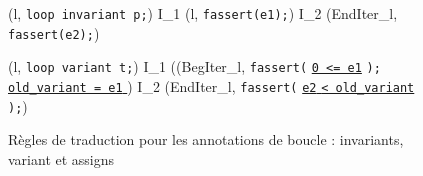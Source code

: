 \begin{figure*}[bt]
  \scriptsize{
    {
      {
      }
    }

    {
      {
        (l, \mbox{\lstinline'loop invariant p;'}) 
        I_1 \concat (l, \mbox{\lstinline'fassert(e1);'})
        \concat I_2 \concat (EndIter_l, \mbox{\lstinline'fassert(e2);'})
      }
    }

    {
      {
        \splitfrac
            {
              (l, \mbox{\lstinline'loop variant t;'}) 
            }
            {
              I_1 \concat ((BegIter_l,
              \mbox{\lstinline'fassert('}
              \underline{\mbox{\lstinline'0 <= e1'}}
              \mbox{\lstinline');' }
              \underline{\Zinit \mbox{\lstinline'old_variant = e1'} \Zclear}
              \semicolon)
              \concat I_2
              \concat(EndIter_l,
              \mbox{\lstinline'fassert('}
              \underline{\mbox{\lstinline'e2'}\Zclear
                \mbox{\lstinline'< old_variant'} \Zclear}
              \mbox{\lstinline');'})
            }
      }
    }
  }
  \caption{Règles de traduction pour les annotations de boucle : invariants,
    variant et assigns}
  \label{fig:loop-annot}
\end{figure*}


